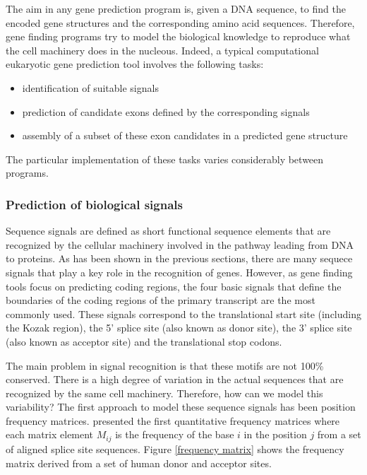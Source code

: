 The aim in any gene prediction program is, given a DNA sequence, to
find the encoded gene structures and the corresponding amino acid
sequences. Therefore, gene finding programs try to model the
biological knowledge to reproduce what the cell machinery does in the
nucleous. Indeed, a typical computational eukaryotic gene prediction
tool involves the following tasks:

\begin{itemize}
\item identification of suitable signals
\item prediction of candidate exons defined by the corresponding signals
\item assembly of a subset of these exon candidates in a predicted 
gene structure
\end{itemize}

The particular implementation of these tasks varies considerably
between programs. 

\subsubsection{Prediction of biological signals}

Sequence signals are defined as short functional sequence elements
that are recognized by the cellular machinery involved in the pathway
leading from DNA to proteins. As has been shown in the previous
sections, there are many sequece signals that play a key role in the
recognition of genes. However, as gene finding tools focus on
predicting coding regions, the four basic signals that define the
boundaries of the coding regions of the primary transcript are the
most commonly used. These signals correspond to the translational
start site (including the Kozak region), the 5' splice site (also
known as donor site), the 3' splice site (also known as acceptor
site) and the translational stop codons.

The main problem in signal recognition is that these motifs are not
100\% conserved.  There is a high degree of variation in the actual
sequences that are recognized by the same cell machinery.  Therefore,
how can we model this variability? The first approach to model these
sequence signals has been position frequency
matrices. \cite{senapathy:1990a} presented the first quantitative
frequency matrices where each matrix element $M_{ij}$ is the frequency
of the base $i$ in the position $j$ from a set of aligned splice site
sequences. Figure \ref{frequency matrix} shows the frequency matrix
derived from a set of human donor and acceptor sites.

